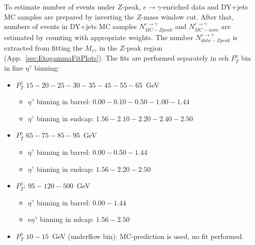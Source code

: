 To estimate number of events under $Z$-peak, $e\rightarrow\gamma$-enriched data and DY+jets MC samples are prepared by inverting the $Z$-mass
window cut. After that, numbers of events in DY+jets MC samples $N_{MC-Zpeak}^{e\rightarrow\gamma}$ and $N_{MC-nom}^{e\rightarrow\gamma}$ are estimated by counting with appropriate weights. The number $N_{data-Zpeak}^{e\rightarrow\gamma}$ is extracted from fitting the $M_{e\gamma}$ in the $Z$-peak region (App.~\ref{sec:EtogammaFitPlots}). The fits are performed separately in ech $P_T^\gamma$ bin in fine $\eta^\gamma$ binning:
     \begin{itemize}
        \item $P_T^\gamma$ $15-20-25-30-35-45-55-65$~GeV
           \begin{itemize}
              \item $\eta^\gamma$ binning in barrel: $0.00-0.10-0.50-1.00-1.44$
              \item $\eta^\gamma$ binning in endcap: $1.56-2.10-2.20-2.40-2.50$
           \end{itemize}
        \item $P_T^\gamma$ $65-75-85-95$~GeV
          \begin{itemize}
              \item $\eta^\gamma$ binning in barrel: $0.00-0.50-1.44$
              \item $\eta^\gamma$ binning in endcap: $1.56-2.20-2.50$
           \end{itemize}
        \item $P_T^\gamma$: $95-120-500$~GeV
          \begin{itemize}
              \item $\eta^\gamma$ binning in barrel: $0.00-1.44$
              \item e$\eta^\gamma$ binning in ndcap: $1.56-2.50$
           \end{itemize}
        \item $P_T^\gamma$ $10-15$~GeV (underflow bin): MC-prediction is used, no fit performed.
     \end{itemize}

